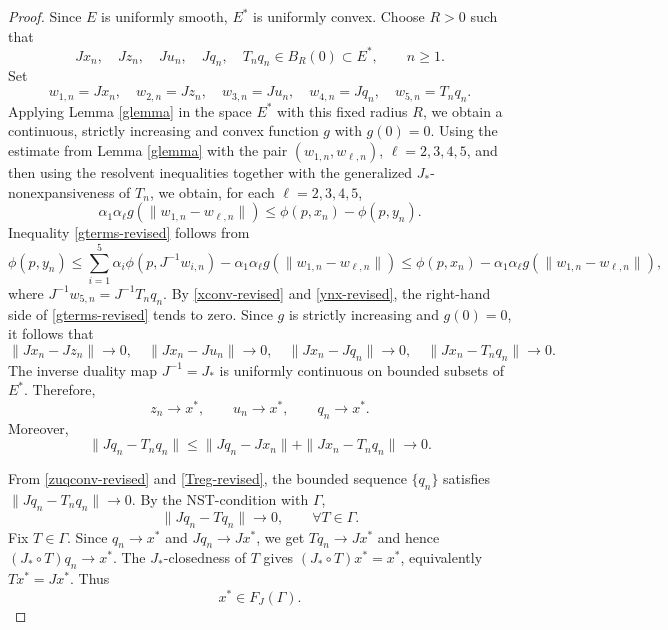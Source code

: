 \documentclass[leqno,12pt]{amsart}
\theoremstyle{definition}
\numberwithin{equation}{section}
\begin{document}
\begin{proof}
Since $E$ is uniformly smooth, $E^{*}$ is uniformly convex. Choose $R>0$ such that
\[
Jx_n,\quad Jz_n,\quad Ju_n,\quad Jq_n,\quad T_nq_n\in B_R(0)\subset E^{*},
\qquad n\geq1.
\]
Set
\[
w_{1,n}=Jx_n,\quad w_{2,n}=Jz_n,\quad w_{3,n}=Ju_n,\quad
w_{4,n}=Jq_n,\quad w_{5,n}=T_nq_n.
\]
Applying Lemma \ref{glemma} in the space $E^{*}$ with this fixed radius $R$, we obtain a continuous, strictly increasing and convex function $g$ with $g(0)=0$. Using the estimate from Lemma \ref{glemma} with the pair $(w_{1,n},w_{\ell,n})$, $\ell=2,3,4,5$, and then using the resolvent inequalities together with the generalized $J_{*}$-nonexpansiveness of $T_n$, we obtain, for each $\ell=2,3,4,5$,
\begin{equation}\label{gterms-revised}
\alpha_1\alpha_{\ell} g(\|w_{1,n}-w_{\ell,n}\|)
\leq \phi(p,x_n)-\phi(p,y_n).
\end{equation}
Inequality \eqref{gterms-revised} follows from
\[
\phi(p,y_n)
\leq \sum_{i=1}^{5}\alpha_i\phi(p,J^{-1}w_{i,n})
      -\alpha_1\alpha_{\ell}g(\|w_{1,n}-w_{\ell,n}\|)
\leq \phi(p,x_n)-\alpha_1\alpha_{\ell}g(\|w_{1,n}-w_{\ell,n}\|),
\]
where $J^{-1}w_{5,n}=J^{-1}T_nq_n$.
By \eqref{xconv-revised} and \eqref{ynx-revised}, the right-hand side of \eqref{gterms-revised} tends to zero. Since $g$ is strictly increasing and $g(0)=0$, it follows that
\[
\|Jx_n-Jz_n\|\to0,\quad \|Jx_n-Ju_n\|\to0,\quad
\|Jx_n-Jq_n\|\to0,\quad \|Jx_n-T_nq_n\|\to0.
\]
The inverse duality map $J^{-1}=J_{*}$ is uniformly continuous on bounded subsets of $E^{*}$. Therefore,
\begin{equation}\label{zuqconv-revised}
z_n\to x^{*},\qquad u_n\to x^{*},\qquad q_n\to x^{*}.
\end{equation}
Moreover,
\begin{equation}\label{Treg-revised}
\|Jq_n-T_nq_n\|\leq \|Jq_n-Jx_n\|+\|Jx_n-T_nq_n\|\to0.
\end{equation}

From \eqref{zuqconv-revised} and \eqref{Treg-revised}, the bounded sequence $\{q_n\}$ satisfies $\|Jq_n-T_nq_n\|\to0$. By the NST-condition with $\Gamma$,
\[
\|Jq_n-Tq_n\|\to0,\qquad \forall T\in\Gamma.
\]
Fix $T\in\Gamma$. Since $q_n\to x^{*}$ and $Jq_n\to Jx^{*}$, we get $Tq_n\to Jx^{*}$ and hence $(J_{*}\circ T)q_n\to x^{*}$. The $J_{*}$-closedness of $T$ gives $(J_{*}\circ T)x^{*}=x^{*}$, equivalently $Tx^{*}=Jx^{*}$. Thus
\begin{equation}\label{xFJ-revised}
x^{*}\in F_J(\Gamma).
\end{equation}



\end{proof}
\end{document}
